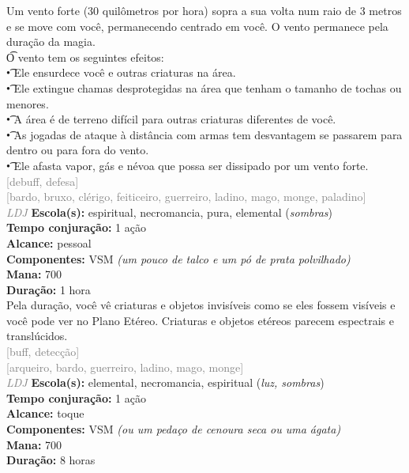 \documentclass{RPG_Adventure}[2021/10/20]
\begin{document}
{\normalsize Um vento forte (30 quilômetros por hora) sopra a sua volta num raio de 3 metros e se move com você, permanecendo centrado em você. O vento permanece pela duração da magia.\\\t O vento tem os seguintes efeitos:\\\t • Ele ensurdece você e outras criaturas na área.\\\t • Ele extingue chamas desprotegidas na área que tenham o tamanho de tochas ou menores.\\\t • A área é de terreno difícil para outras criaturas diferentes de você.\\\t • As jogadas de ataque à distância com armas tem desvantagem se passarem para dentro ou para fora do vento.\\\t • Ele afasta vapor, gás e névoa que possa ser dissipado por um vento forte.\\}
{\scriptsize \textcolor{gray}{[debuff, defesa]\\}}
{\scriptsize \textcolor{gray}{[bardo, bruxo, clérigo, feiticeiro, guerreiro, ladino, mago, monge, paladino]\\}}
{\tiny \textcolor{gray}{\textit{LDJ}}}\jump{}
{\small \t \textbf{Escola(s):} espiritual, necromancia, pura, elemental (\textit{sombras})\\\t \textbf{Tempo conjuração:} 1 ação\\\t \textbf{Alcance:} pessoal\\\t \textbf{Componentes:} VSM \textit{(um pouco de talco e um pó de prata polvilhado)}\\\t \textbf{Mana:} 700\\\t \textbf{Duração:} 1 hora\\}
{\normalsize Pela duração, você vê criaturas e objetos invisíveis como se eles fossem visíveis e você pode ver no Plano Etéreo. Criaturas e objetos etéreos parecem espectrais e translúcidos.\\}
{\scriptsize \textcolor{gray}{[buff, detecção]\\}}
{\scriptsize \textcolor{gray}{[arqueiro, bardo, guerreiro, ladino, mago, monge]\\}}
{\tiny \textcolor{gray}{\textit{LDJ}}}\jump{}
{\small \t \textbf{Escola(s):} elemental, necromancia, espiritual (\textit{luz, sombras})\\\t \textbf{Tempo conjuração:} 1 ação\\\t \textbf{Alcance:} toque\\\t \textbf{Componentes:} VSM \textit{(ou um pedaço de cenoura seca ou uma ágata)}\\\t \textbf{Mana:} 700\\\t \textbf{Duração:} 8 horas\\}
\end{document}
